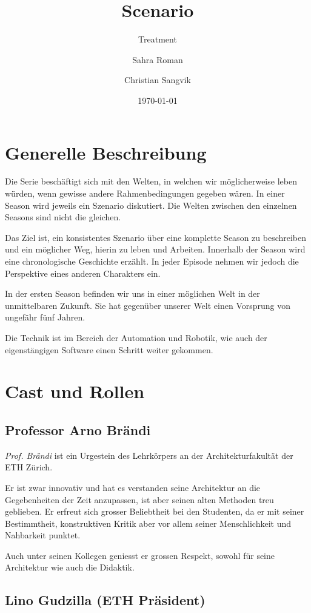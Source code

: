 \documentclass[11pt,a4paper,ngerman]{scrreprt}
\author{Sahra Roman \and Christian Sangvik}
\date{\today}
\title{Scenario}
\subtitle{Treatment}
\begin{document}
\maketitle

\chapter*{Generelle Beschreibung}

Die Serie beschäftigt sich mit den Welten, in welchen wir
möglicherweise leben würden, wenn gewisse andere Rahmenbedingungen gegeben
wären. In einer Season wird jeweils ein Szenario diskutiert. Die Welten
zwischen den einzelnen Seasons sind nicht die gleichen.

Das Ziel ist, ein konsistentes Szenario über eine komplette Season zu
beschreiben und ein möglicher Weg, hierin zu leben und Arbeiten. Innerhalb der
Season wird eine chronologische Geschichte erzählt. In jeder Episode nehmen
wir jedoch die Perspektive eines anderen Charakters ein.

In der ersten Season befinden wir uns in einer möglichen Welt in der
unmittelbaren Zukunft. Sie hat gegenüber unserer Welt einen Vorsprung von
ungefähr fünf Jahren.

Die Technik ist im Bereich der Automation und Robotik, wie auch der
eigenstängigen Software einen Schritt weiter gekommen.

\chapter*{Cast und Rollen}
\section*{Professor Arno Brändi}

\emph{Prof. Brändi} ist ein Urgestein des Lehrkörpers an der Architekturfakultät
der ETH Zürich.

Er ist zwar innovativ und hat es verstanden seine Architektur an die
Gegebenheiten der Zeit anzupassen, ist aber seinen alten Methoden treu
geblieben. Er erfreut sich grosser Beliebtheit bei den Studenten, da er mit
seiner Bestimmtheit, konstruktiven Kritik aber vor allem seiner
Menschlichkeit und Nahbarkeit punktet.

Auch unter seinen Kollegen geniesst er grossen Respekt, sowohl für seine
Architektur wie auch die Didaktik.

\section*{Lino Gudzilla (ETH Präsident)}
\end{document}
